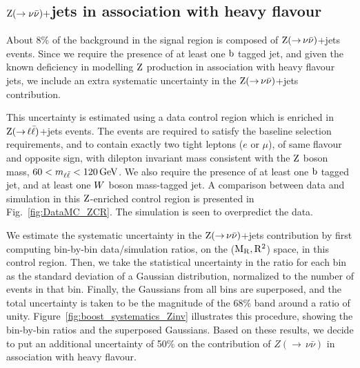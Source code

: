 \subsection{\texorpdfstring{$\mathrm{Z} (\rightarrow \nu \bar{\nu})+$jets}{Z(nunu)+jets} in
association with heavy flavour} 

About 8\% of the background in the signal region is composed of
$\mathrm{Z}({\rightarrow}\,\nu\bar{\nu})$+jets
events. Since we require the presence of at least one $\mathrm{b}$ tagged jet, and given the known
deficiency in modelling $\mathrm{Z}$ production in association with heavy flavour jets, we include an
extra systematic uncertainty in the $\mathrm{Z}({\rightarrow}\,\nu\bar{\nu})$+jets contribution.  

This uncertainty is estimated using a data control region which is enriched in
$\mathrm{Z}({\rightarrow}\, \ell \bar{\ell})$+jets events. The events are required to satisfy the
baseline selection requirements, and to contain exactly two tight leptons ($e$ or $\mu$), of same
flavour and opposite
sign, with dilepton invariant mass consistent with the $\mathrm{Z}$ boson mass, $60 < m_{\ell\bar{\ell}} <
120\,\text{Ge\hspace{-.08em}V}$.
We also require the presence of at least one $\mathrm{b}$ tagged jet, and at least one $W$
boson mass-tagged jet.  A comparison between data and simulation in this $\mathrm{Z}$-enriched control
region is presented in Fig.~\ref{fig:DataMC_ZCR}. The simulation is seen to overpredict the data. 

We estimate the systematic uncertainty in the $\mathrm{Z}({\rightarrow}\,\nu\bar{\nu})$+jets contribution
by first computing bin-by-bin data/simulation ratios, on the ($\mathrm{M_R},\mathrm{R^2}$) space, in this control
region. Then, we take the statistical uncertainty in the ratio for each bin as the
standard deviation of a Gaussian distribution, normalized to the number of events in that bin.  
Finally, the Gaussians from all bins are superposed, and the total uncertainty is taken to be the
magnitude of the 68\% band around a ratio of unity. 
Figure~\ref{fig:boost_systematics_Zinv} illustrates this procedure, showing the bin-by-bin ratios
and the superposed Gaussians.
Based on these results, we decide to put an additional uncertainty of 50\% on the contribution of 
$Z({\rightarrow}\,\nu\bar{\nu})$ in association with heavy flavour. 

